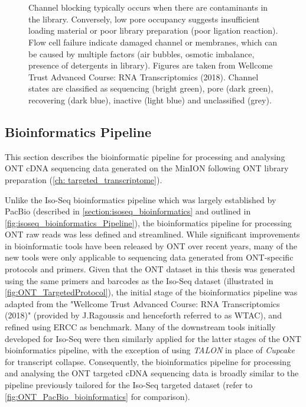 \begin{figure}[]
{	\\ \\
	Channel blocking typically occurs when there are contaminants in the library. Conversely, low pore occupancy suggests insufficient loading material or poor library preparation (poor ligation reaction). Flow cell failure indicate damaged channel or membranes, which can be caused by multiple factors (air bubbles, osmotic imbalance, presence of detergents in library). Figures are taken from Wellcome Trust Advanced Course: RNA Transcriptomics (2018). Channel states are classified as sequencing (bright green), pore (dark green), recovering (dark blue), inactive (light blue) and unclassified (grey).}
	\label{fig:ONTPoreOccupancy}
\end{figure}

\clearpage
\subsection{Bioinformatics Pipeline}
\label{section:ont_bioinformatics}
This section describes the bioinformatic pipeline for processing and analysing ONT cDNA sequencing data generated on the MinION following ONT library preparation (\cref{ch: targeted_transcriptome}). 

Unlike the Iso-Seq bioinformatics pipeline which was largely established by PacBio (described in \cref{section:isoseq_bioinformatics} and outlined in \cref{fig:isoseq_bioinformatics_Pipeline}), the bioinformatics pipeline for processing ONT raw reads was less defined and streamlined. While significant improvements in bioinformatic tools have been released by ONT over recent years, many of the new tools were only applicable to sequencing data generated from ONT-specific protocols and primers. Given that the ONT dataset in this thesis was generated using the same primers and barcodes as the Iso-Seq dataset (illustrated in \cref{fig:ONT_TargetedProtocol}), the initial stage of the bioinformatics pipeline was adapted from the "Wellcome Trust Advanced Course: RNA Transcriptomics (2018)" (provided by J.Ragoussis and henceforth referred to as WTAC), and refined using ERCC as benchmark. Many of the downstream tools initially developed for Iso-Seq were then similarly applied for the latter stages of the ONT bioinformatics pipeline, with the exception of using \textit{TALON} in place of \textit{Cupcake} for transcript collapse. Consequently, the bioinformatics pipeline for processing and analysing the ONT targeted cDNA sequencing data is broadly similar to the pipeline previously tailored for the Iso-Seq targeted dataset (refer to \cref{fig:ONT_PacBio_bioinformatics} for comparison). 

